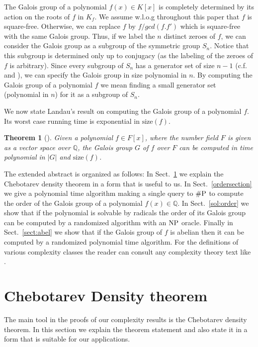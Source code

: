 \documentclass{article}
\newtheorem{theorem}{Theorem}[section]
\newcommand{\Q}[0]{\ensuremath{\mathbb{Q}}}
\newcommand{\size}[0]{\ensuremath{\mathrm{size}}}
\newcommand{\NP}{\mbox{\rm NP}}
\newcommand{\numP}{\mbox{\rm \#P}}
\begin{document}
The Galois group of a polynomial $f(x) \in K[x]$ is completely
determined by its action on the roots of $f$ in $K_f$.  We assume
w.l.o.g throughout this paper that $f$ is square-free. Otherwise, we
can replace $f$ by $f/gcd(f.f')$ which is square-free with the same
Galois group. Thus, if we label the $n$ distinct zeroes of $f$, we can
consider the Galois group as a subgroup of the symmetric group $S_n$.
Notice that this subgroup is determined only up to conjugacy (as the
labeling of the zeroes of $f$ is arbitrary).  Since every subgroup of
$S_n$ has a generator set of size $n-1$ (c.f.\ 
\cite{sims70computational} and \cite{luks93permutation}), we can
specify the Galois group in size polynomial in $n$. By computing the
Galois group of a polynomial $f$ we mean finding a small generator set
(polynomial in $n$) for it as a subgroup of $S_n$.

We now state Landau's result on computing the Galois group of a
polynomial $f$. Its worst case running time is exponential in
$\size(f)$.

\begin{theorem}[\cite{landau:1984:galois}]\label{splitfind}
  Given a polynomial $f\in F[x]$, where the number field $F$ is given
  as a vector space over $\Q$, the Galois group $G$ of $f$ over $F$
  can be computed in time polynomial in $|G|$ and $\size(f)$.
\end{theorem}

The extended abstract is organized as follows: In
Sect.~\ref{sect:cheb} we explain the Chebotarev density theorem in a
form that is useful to us. In Sect.~\ref{ordersection} we give a
polynomial time algorithm making a single query to $\numP$ to compute
the order of the Galois group of a polynomial $f(x) \in \Q$. In
Sect.~\ref{sol:order} we show that if the polynomial is solvable by
radicals the order of its Galois group can be computed by a randomized
algorithm with an $\NP$ oracle.  Finally in Sect.~\ref{sect:abel} we
show that if the Galois group of $f$ is abelian then it can be
computed by a randomized polynomial time algorithm. For the
definitions of various complexity classes the reader can consult any
complexity theory text like \cite{BDG}.



\section{Chebotarev Density theorem}\label{sect:cheb} 

The main tool in the proofs of our complexity results is the
Chebotarev density theorem. In this section we explain the theorem
statement and also state it in a form that is suitable for our
applications.
\end{document}
